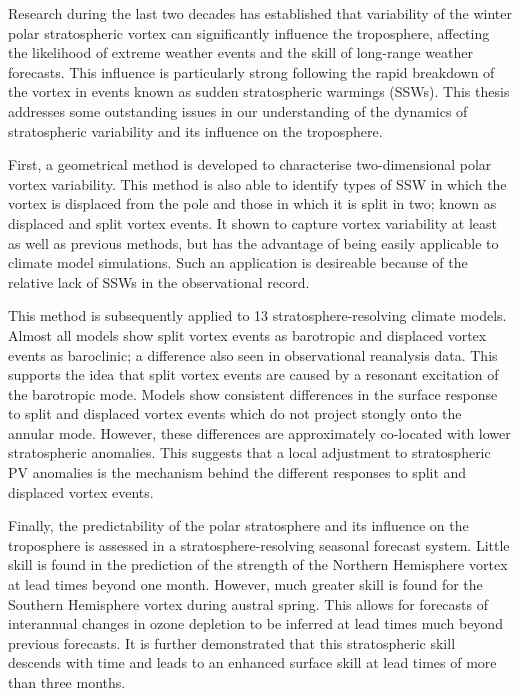 \begin{abstractseparate}

  Research during the last two decades has established that variability of the
  winter polar stratospheric vortex can significantly influence the troposphere,
  affecting the likelihood of extreme weather events and the skill of long-range
  weather forecasts. This influence is particularly strong following the rapid
  breakdown of the vortex in events known as sudden stratospheric warmings
  (SSWs). This thesis addresses some outstanding issues in our understanding of
  the dynamics of stratospheric variability and its influence on the
  troposphere.

  First, a geometrical method is developed to characterise two-dimensional polar
  vortex variability. This method is also able to identify types of SSW in which
  the vortex is displaced from the pole and those in which it is split in two;
  known as displaced and split vortex events. It shown to capture vortex
  variability at least as well as previous methods, but has the advantage of
  being easily applicable to climate model simulations. Such an application is
  desireable because of the relative lack of SSWs in the observational record.


  This method is subsequently applied to 13 stratosphere-resolving climate
  models. Almost all models show split vortex events as barotropic and displaced
  vortex events as baroclinic; a difference also seen in observational
  reanalysis data. This supports the idea that split vortex events are caused by
  a resonant excitation of the barotropic mode. Models show consistent
  differences in the surface response to split and displaced vortex events which
  do not project stongly onto the annular mode. However, these differences are
  approximately co-located with lower stratospheric anomalies. This suggests
  that a local adjustment to stratospheric PV anomalies is the mechanism behind
  the different responses to split and displaced vortex events.

  Finally, the predictability of the polar stratosphere and its influence on the
  troposphere is assessed in a stratosphere-resolving seasonal forecast
  system. Little skill is found in the prediction of the strength of the
  Northern Hemisphere vortex at lead times beyond one month. However, much
  greater skill is found for the Southern Hemisphere vortex during austral
  spring. This allows for forecasts of interannual changes in ozone depletion to
  be inferred at lead times much beyond previous forecasts. It is further
  demonstrated that this stratospheric skill descends with time and leads to an
  enhanced surface skill at lead times of more than three months. 
 



\end{abstractseparate}

